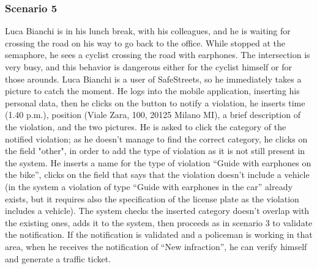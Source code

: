 \subsubsection{Scenario 5}
Luca Bianchi is in his lunch break, with his colleagues, and he is waiting for crossing the road on his way to go back to the office. While stopped at the semaphore, he sees a cyclist crossing the road with earphones. The intersection is very busy, and this behavior is dangerous either for the cyclist himself or for those arounds. Luca Bianchi is a user of SafeStreets, so he immediately takes a picture to catch the moment. He logs into the mobile application, inserting his personal data, then he clicks on the button to notify a violation, he inserts time (1.40 p.m.), position (Viale Zara, 100, 20125 Milano MI), a brief description of the violation, and the two pictures. He is asked to click the category of the notified violation; as he doesn’t manage to find the correct category, he clicks on the field "other", in order to add the type of violation as it is not still present in the system. He inserts a name for the type of violation “Guide with earphones on the bike”, clicks on the field that says that the violation doesn’t include a vehicle (in the system a violation of type “Guide with earphones in the car” already exists, but it requires also the specification of the license plate as the violation includes a vehicle). The system checks the inserted category doesn’t overlap with the existing ones, adds it to the system, then proceeds as in scenario 3 to validate the notification. If the notification is validated and a policeman is working in that area, when he receives the notification of “New infraction”, he can verify himself and generate a traffic ticket.

